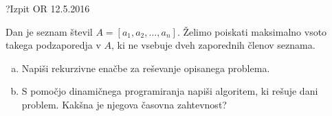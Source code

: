 \begin{naloga}{?}{Izpit OR 12.5.2016}
\begin{vprasanje}
Dan je seznam števil $A = [a_1, a_2, \dots, a_n]$.
Želimo poiskati maksimalno vsoto takega podzaporedja v $A$,
ki ne vsebuje dveh zaporednih členov seznama.

\begin{enumerate}[(a)]
\item Napiši rekurzivne enačbe za reševanje opisanega problema.

\item S pomočjo dinamičnega programiranja napiši algoritem,
ki rešuje dani problem.
Kakšna je njegova časovna zahtevnost?
\end{enumerate}
\end{vprasanje}
\begin{odgovor}
\end{odgovor}
\end{naloga}
